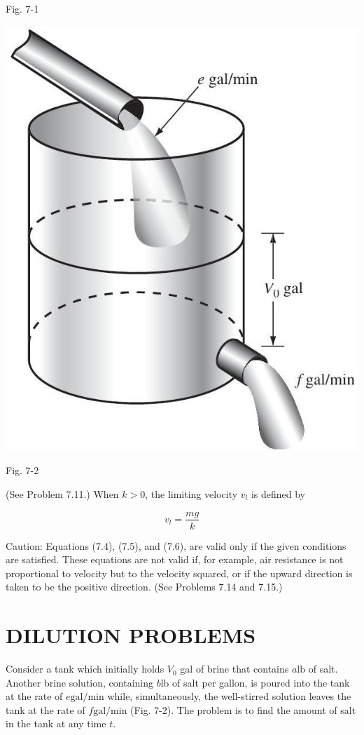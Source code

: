 \documentclass[10pt]{article}
\begin{document}
Fig. 7-1

\begin{center}
\includegraphics[max width=\textwidth]{2024_04_03_5bb5b4275a64cb9887d1g-069}
\end{center}

Fig. 7-2

(See Problem 7.11.) When $k>0$, the limiting velocity $v_{l}$ is defined by


\begin{equation*}
v_{l}=\frac{m g}{k} \tag{7.6}
\end{equation*}


Caution: Equations (7.4), (7.5), and (7.6), are valid only if the given conditions are satisfied. These equations are not valid if, for example, air resistance is not proportional to velocity but to the velocity squared, or if the upward direction is taken to be the positive direction. (See Problems 7.14 and 7.15.)

\section*{DILUTION PROBLEMS}
Consider a tank which initially holds $V_{0}$ gal of brine that contains $a \mathrm{lb}$ of salt. Another brine solution, containing $b \mathrm{lb}$ of salt per gallon, is poured into the tank at the rate of $e \mathrm{gal} / \mathrm{min}$ while, simultaneously, the well-stirred solution leaves the tank at the rate of $f \mathrm{gal} / \mathrm{min}$ (Fig. 7-2). The problem is to find the amount of salt in the tank at any time $t$.
\end{document}
